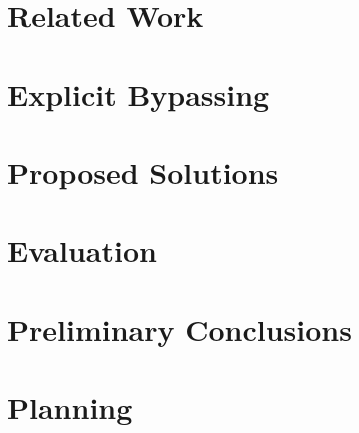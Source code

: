 \documentclass[a4paper,10pt,twoside]{report}
\begin{document}

%


%


\chapter{Related Work}\label{chapter:related_work}



\chapter{Explicit Bypassing}\label{chapter:explicit_bypassing}



\chapter{Proposed Solutions}\label{chapter:solutions}



\chapter{Evaluation}\label{chapter:evaluation}



\chapter{Preliminary Conclusions}\label{chapter:conclusions}



\chapter{Planning}\label{chapter:planning}
				



%



\appendix
{}


\end{document}
